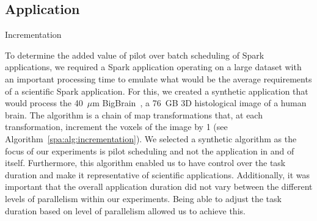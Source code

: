 	\subsection{Application}
	    \begin{algorithm}\caption{Incrementation}\label{spa:alg:incrementation}              
	    \end{algorithm}
	To determine the added value of pilot over batch scheduling of Spark
	applications, we required a Spark application operating on a large dataset with
	an important processing time to emulate what would be the average requirements
	of a scientific Spark application. For this, we created a synthetic application 
	that would process the 40~$\mu$m BigBrain~\cite{amunts2013bigbrain}, a 76~GB 3D histological
	image of a human brain. The algorithm is a chain of map transformations that,
	at each transformation, increment the voxels of the image by 1 (see Algorithm~\ref{spa:alg:incrementation}).
	We selected a synthetic algorithm
	as the focus of our experiments is pilot scheduling and not the application in
	and of itself. Furthermore, this algorithm enabled us to have control over the task duration and make it representative of scientific applications. Additionally, it was important
	that the overall application duration did not vary between the different levels of
	parallelism within our experiments. Being able to adjust the task duration based on
	level of parallelism allowed us to achieve this.
    

